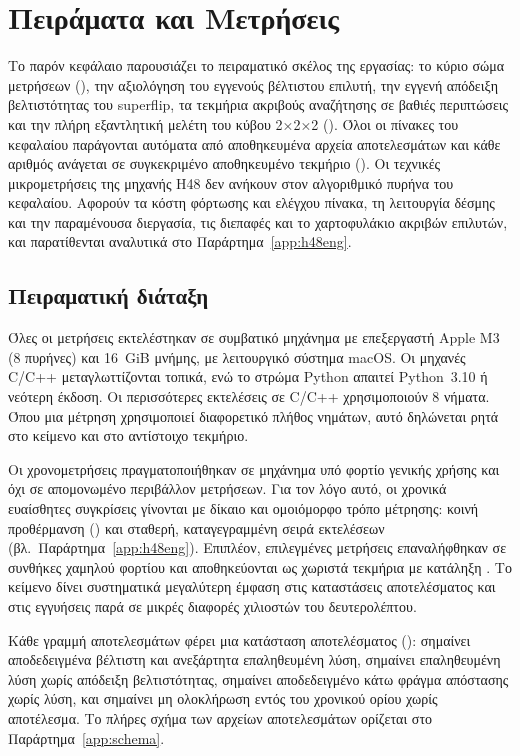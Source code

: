 \chapter{Πειράματα και Μετρήσεις}
\label{chap:experiments}

Το παρόν κεφάλαιο παρουσιάζει το πειραματικό σκέλος της εργασίας: το κύριο σώμα μετρήσεων (), την αξιολόγηση του εγγενούς βέλτιστου επιλυτή, την εγγενή απόδειξη βελτιστότητας του superflip, τα τεκμήρια ακριβούς αναζήτησης σε βαθιές περιπτώσεις και την πλήρη εξαντλητική μελέτη του κύβου 2×2×2 (). Όλοι οι πίνακες του κεφαλαίου παράγονται αυτόματα από αποθηκευμένα αρχεία αποτελεσμάτων και κάθε αριθμός ανάγεται σε συγκεκριμένο αποθηκευμένο τεκμήριο (). Οι τεχνικές μικρομετρήσεις της μηχανής H48 δεν ανήκουν στον αλγοριθμικό πυρήνα του κεφαλαίου. Αφορούν τα κόστη φόρτωσης και ελέγχου πίνακα, τη λειτουργία δέσμης και την παραμένουσα διεργασία, τις διεπαφές και το χαρτοφυλάκιο ακριβών επιλυτών, και παρατίθενται αναλυτικά στο Παράρτημα~\ref{app:h48eng}.

\section{Πειραματική διάταξη}
\label{sec:experiments-setup}

Όλες οι μετρήσεις εκτελέστηκαν σε συμβατικό μηχάνημα με επεξεργαστή Apple M3 (8 πυρήνες) και 16~GiB μνήμης, με λειτουργικό σύστημα macOS. Οι μηχανές C/C++ μεταγλωττίζονται τοπικά, ενώ το στρώμα Python απαιτεί Python~3.10 ή νεότερη έκδοση. Οι περισσότερες εκτελέσεις σε C/C++ χρησιμοποιούν 8 νήματα. Όπου μια μέτρηση χρησιμοποιεί διαφορετικό πλήθος νημάτων, αυτό δηλώνεται ρητά στο κείμενο και στο αντίστοιχο τεκμήριο.

Οι χρονομετρήσεις πραγματοποιήθηκαν σε μηχάνημα υπό φορτίο γενικής χρήσης και όχι σε απομονωμένο περιβάλλον μετρήσεων. Για τον λόγο αυτό, οι χρονικά ευαίσθητες συγκρίσεις γίνονται με δίκαιο και ομοιόμορφο τρόπο μέτρησης: κοινή προθέρμανση () και σταθερή, καταγεγραμμένη σειρά εκτελέσεων (βλ.~Παράρτημα~\ref{app:h48eng}). Επιπλέον, επιλεγμένες μετρήσεις επαναλήφθηκαν σε συνθήκες χαμηλού φορτίου και αποθηκεύονται ως χωριστά τεκμήρια με κατάληξη . Το κείμενο δίνει συστηματικά μεγαλύτερη έμφαση στις καταστάσεις αποτελέσματος και στις εγγυήσεις παρά σε μικρές διαφορές χιλιοστών του δευτερολέπτου.

Κάθε γραμμή αποτελεσμάτων φέρει μια κατάσταση αποτελέσματος ():  σημαίνει αποδεδειγμένα βέλτιστη και ανεξάρτητα επαληθευμένη λύση,  σημαίνει επαληθευμένη λύση χωρίς απόδειξη βελτιστότητας,  σημαίνει αποδεδειγμένο κάτω φράγμα απόστασης χωρίς λύση, και  σημαίνει μη ολοκλήρωση εντός του χρονικού ορίου χωρίς αποτέλεσμα. Το πλήρες σχήμα των αρχείων αποτελεσμάτων ορίζεται στο Παράρτημα~\ref{app:schema}.

